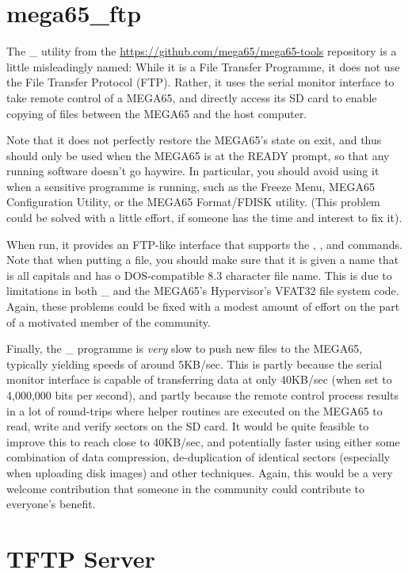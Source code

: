 \section{mega65\_ftp}

The \_ utility from
the \url{https://github.com/mega65/mega65-tools} repository is a
little misleadingly named: While it 
is a File Transfer Programme, it does not use the File Transfer
Protocol (FTP).  Rather, it uses the serial monitor interface to take
remote control of a MEGA65, and directly access its SD card to enable
copying of files between the MEGA65 and the host computer.

Note that it does not perfectly restore the MEGA65's state on exit,
and thus should only be used when the MEGA65 is at the READY prompt,
so that any running software doesn't go haywire. In particular, you
should avoid using it when a sensitive programme is running, such as
the Freeze Menu, MEGA65 Configuration Utility, or the MEGA65
Format/FDISK utility.  (This problem could be solved with a little
effort, if someone has the time and interest to fix it).

When run, it provides an FTP-like interface that supports
the , ,  and  commands.
Note that when putting a file, you should make sure that it is given a
name that is all capitals and has o DOS-compatible 8.3 character file
name.  This is due to limitations in both \_ and the
MEGA65's Hypervisor's VFAT32 file system code. Again, these problems
could be fixed with a modest amount of effort on the part of a
motivated member of the community.

Finally, the \_ programme is {\em very} slow to push
new files to the MEGA65, typically yielding speeds of around 5KB/sec.
This is partly because the serial monitor interface is capable of
transferring data at only 40KB/sec (when set to 4,000,000 bits per
second), and partly because the remote control process results in a
lot of round-trips where helper routines are executed on the MEGA65 to
read, write and verify sectors on the SD card.  It would be quite
feasible to improve this to reach close to 40KB/sec, and potentially
faster using either some combination of data compression,
de-duplication of identical sectors (especially when uploading disk
images) and other techniques. Again, this would be a very welcome
contribution that someone in the community could contribute to
everyone's benefit.

\section{TFTP Server}

